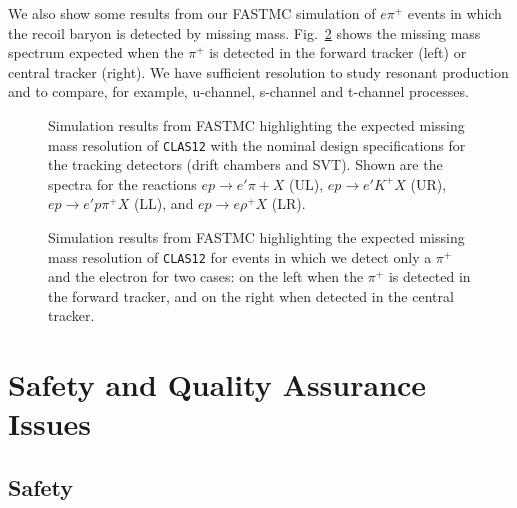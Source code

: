 We also show some results from our FASTMC simulation of $e \pi^+$ events
in which the recoil baryon is detected by missing mass.  
Fig.~\ref{centralmassplot} shows the missing mass spectrum expected when
the $\pi^+$ is detected in the forward tracker (left) or central tracker
(right).  We have sufficient resolution to study resonant production and
to compare, for example, u-channel, s-channel and t-channel processes.

\begin{figure}[htbp]
\vspace{14.0cm}
\caption{\small{Simulation results from FASTMC highlighting the expected 
missing mass resolution of {\tt CLAS12} with the nominal design 
specifications for the tracking detectors (drift chambers and SVT).  Shown 
are the spectra for the reactions $ep \to e'\pi+X$ (UL), $ep \to e'K^+X$ (UR),
$ep \to e'p\pi^+X$ (LL), and $ep \to e\rho^+X$ (LR).}}
\label{massplot}
\end{figure}

\begin{figure}[htbp]
\vspace{6.0cm}
\caption{\small{Simulation results from FASTMC highlighting the expected 
missing mass resolution of {\tt CLAS12} for events in which we detect only
a $\pi^+$ and the electron for two cases: on the left when the $\pi^+$
is detected in the forward tracker, and on the right when detected in
the central tracker.}}
\label{centralmassplot}
\end{figure}

\section{Safety and Quality Assurance Issues}

\subsection{Safety}

